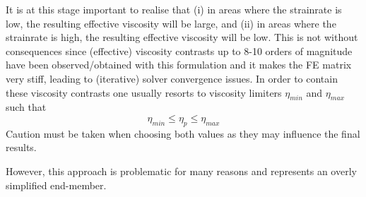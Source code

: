 It is at this stage important to realise that (i) in areas where the strainrate is low, the resulting effective viscosity will be large, and 
(ii) in areas where the strainrate is high, the resulting effective viscosity will be low. This is not without consequences since 
(effective) viscosity contrasts up to 8-10 orders of magnitude have been observed/obtained with this formulation and it makes the FE 
matrix very stiff, leading to (iterative) solver convergence issues.
In order to contain these viscosity contrasts one usually resorts to viscosity limiters $\eta_{min}$ and $\eta_{max}$ such that 
\[
\eta_{min} \leq \eta_p \leq \eta_{max}
\]
Caution must be taken when choosing both values as they may influence the final results.

However, this approach is problematic for many reasons and represents an overly simplified end-member. 




